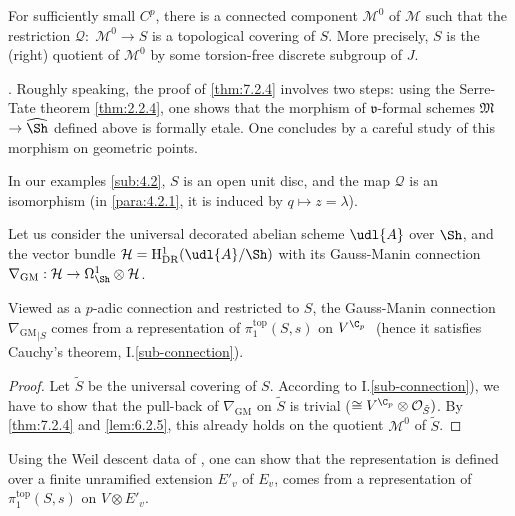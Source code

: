 \begin{thm}\label{thm:7.2.4}
 For sufficiently small $C^p$, there is a connected component
 $\mathcal{M}^0$ of $\mathcal{M}$ such that the restriction
 $\mathcal{Q}:\;\mathcal{M}^0\rightarrow S$ is a topological covering of
 $S$. More precisely, $S$ is the (right) quotient of $\mathcal{M}^0$ by
 some torsion-free discrete subgroup of $J$.
\end{thm}

\cf \cite[6.23, 6.31]{psfpg}. Roughly speaking, the proof of \ref{thm:7.2.4}
involves two steps: using the Serre-Tate theorem \ref{thm:2.2.4}, one
shows that 
the morphism of $\mathfrak{v}$-formal schemes $\mathfrak{M}$
$\rightarrow \widehat{\Sh}$ defined above is
formally etale. One concludes by a careful study of this morphism on
geometric points.

In our examples \ref{sub:4.2}, $S$ is an open unit
disc, and the map $\mathcal{Q}$ is an isomorphism (in \ref{para:4.2.1}, it is
induced by $q\mapsto z=\lambda$).

\begin{para}\label{para:7.2.5} Let us consider the universal decorated
 abelian scheme $\udl{A}$ over $\Sh$, and the vector bundle
 $\mathcal{H}=\mathrm{H}^1_{\mathrm{DR}}(\udl{A}/\Sh)$ with its
 Gauss-Manin connection 
 $\nabla_{\mathrm{GM}}:\mathcal{H}\rightarrow \Omega^1_{\Sh}\otimes
 \mathcal{H}$. 
\end{para}

\begin{cor}\label{cor:7.2.6}  Viewed as a $p$-adic connection and
 restricted to $S$, the Gauss-Manin connection 
 ${\nabla_{\mathrm{GM}}}_{| S}$ comes from a representation of
 $\pi_1^{\mathrm{top}}(S,s)$ on $V^{\C_p}\;$ (hence it satisfies
 Cauchy's theorem, \cf I.\ref{sub-connection}).
\end{cor}

\begin{proof}
 Let $\tilde{S}$ be the universal covering of $S$. According to
 I.\ref{sub-connection}), we have to show that the pull-back of 
 $\nabla_{\mathrm{GM}}$ on $\tilde{S}$ is trivial ($\cong V^{\C_p}\otimes
 \mathcal{O}_{\tilde{S}})$. By \ref{thm:7.2.4} and \ref{lem:6.2.5}, this
 already holds on the quotient $\mathcal{M}^0$ of $\tilde{S}$.
\end{proof}

  Using the Weil descent data of \cite[6.21]{psfpg},
 one can show that the representation is defined over a
 finite unramified extension $E'_v$ of $E_v$, \ie comes from a
 representation of $\pi_1^{\mathrm{top}}(S,s)$ on $V\otimes E'_v$.

